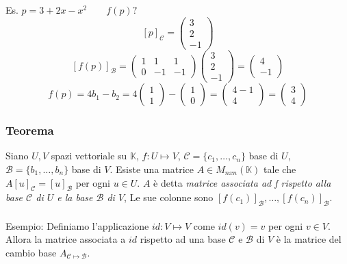 \documentclass[12pt]{article}
\begin{document}
\\\\
Es. $p = 3 + 2x - x^2 \quad \quad f(p)?$
\[[p]_{\mathcal{C}} = \begin{pmatrix}
    3\\
    2\\
    -1
\end{pmatrix}\]
\[[f(p)]_{\mathcal{B}} = \begin{pmatrix}
    1 & 1 & 1\\
    0 & -1 & -1
\end{pmatrix}\begin{pmatrix}
    3\\
    2\\
    -1
\end{pmatrix} = \begin{pmatrix}
    4\\
    -1
\end{pmatrix}\]
\[f(p) = 4b_1 - b_2 = 4\begin{pmatrix}
    1\\
    1
\end{pmatrix} - \begin{pmatrix}
    1\\
    0
\end{pmatrix} = \begin{pmatrix}
    4-1\\
    4
\end{pmatrix} = \begin{pmatrix}
    3\\
    4
\end{pmatrix}\]

\subsubsection{Teorema}

Siano $U, V$ spazi vettoriale su $\mathbb{K}$, $f: U \mapsto V$, $\mathcal{C} = \{c_1, \dots, c_n\}$ base di $U$, $\mathcal{B} = \{b_1, \dots, b_n\}$ base di $V$.
Esiste una matrice $A \in M_{nxn} (\mathbb{K})$ tale che $A[u]_{\mathcal{C}} = [u]_{\mathcal{B}}$ per ogni $u \in U$. $A$ è detta \textit{matrice associata ad f rispetto alla base $\mathcal{C}$ di $U$ e la base $\mathcal{B}$ di $V$}, Le sue colonne sono $[f(c_1)]_{\mathcal{B}}, \dots, [f(c_n)]_{\mathcal{B}}$.
\\\\
Esempio:
Definiamo l'applicazione $id: V \mapsto V$ come $id(v) = v$ per ogni $v \in V$. Allora la matrice associata a $id$ rispetto ad una base $\mathcal{C}$ e $\mathcal{B}$ di $V$ è la matrice del cambio base $A_{\mathcal{C} \mapsto \mathcal{B}}$.
\pagebreak
\end{document}
